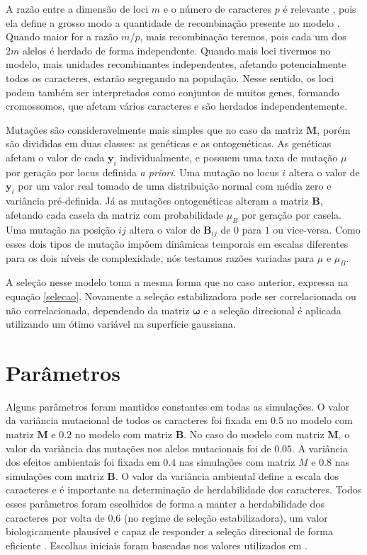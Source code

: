 A razão entre a dimensão de loci $m$ e o número de caracteres $p$ é
relevante , pois ela define a grosso modo a quantidade
de recombinação presente no modelo \citep{Wagner1984}.
Quando maior for a razão $m/p$, mais recombinação teremos, pois cada um
dos $2m$ alelos é herdado de forma independente.
Quando mais loci tivermos no modelo, mais unidades recombinantes
independentes, afetando potencialmente todos os caracteres, estarão
segregando na população.
Nesse sentido, os loci podem também ser interpretados como conjuntos de
muitos genes, formando cromossomos, que afetam vários caracteres e são
herdados independentemente.

Mutações são consideravelmente mais simples que no caso da matriz
$\mathbf{M}$, porém são divididas em duas classes: as genéticas e as
ontogenéticas.
As genéticas afetam o valor de cada $\mathbf{y}_i$ individualmente, e
possuem uma taxa de mutação $\mu$ por geração por locus definida {\it a
priori}.
Uma mutação no locus $i$ altera o valor de $\mathbf{y}_i$ por um valor real tomado
de uma distribuição normal com média zero e variância pré-definida.
Já as mutações ontogenéticas alteram a matriz $\mathbf{B}$, afetando cada casela
da matriz com probabilidade $\mu_B$ por geração por casela.
Uma mutação na posição $ij$ altera o valor de $\mathbf{B}_{ij}$ de $0$ para $1$
ou vice-versa.
Como esses dois tipos de mutação impõem dinâmicas temporais em escalas
diferentes para os dois níveis de complexidade, nós testamos razões
variadas para $\mu$ e $\mu_B$.

A seleção nesse modelo toma a mesma forma que no caso anterior, expressa
na equação \ref{selecao}.
Novamente a seleção estabilizadora pode ser correlacionada ou não
correlacionada, dependendo da matriz $\pmb{\omega}$ e a seleção direcional é
aplicada utilizando um ótimo variável na superfície gaussiana.

\section{Parâmetros}\label{cap2:parametros}

Alguns parâmetros foram mantidos constantes em todas as simulações.
O valor da variância mutacional de todos os caracteres foi fixada em
$0.5$ no modelo com matriz $\mathbf{M}$ e $0.2$ no modelo com matriz
$\mathbf{B}$.
No caso do modelo com matriz $\mathbf{M}$, o valor da variância das
mutações nos alelos mutacionais foi de $0.05$.
A variância dos efeitos ambientais foi fixada em $0.4$ nas simulações com
matriz $M$ e $0.8$ nas simulações com matriz $\mathbf{B}$.
O valor da variância ambiental define a escala dos caracteres e é
importante na determinação de herdabilidade dos caracteres.
Todos esses parâmetros foram escolhidos de forma a manter a
herdabilidade dos caracteres por volta de $0.6$ (no regime de seleção
estabilizadora), um valor biologicamente plausível e capaz de responder
a seleção direcional de forma eficiente \citep{Cheverud1988}.
Escolhas iniciais foram baseadas nos valores utilizados em
\cite{Jones2003, Jones2004, Jones2007}.

